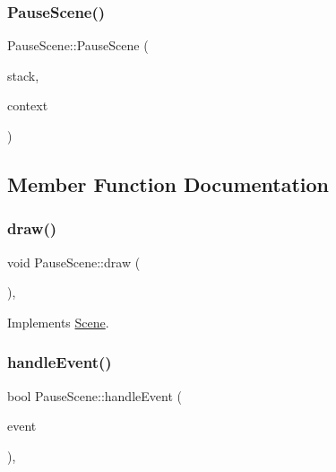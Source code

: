 \subsubsection{\texorpdfstring{Pause\+Scene()}{PauseScene()}}
{\footnotesize\ttfamily Pause\+Scene\+::\+Pause\+Scene (\begin{DoxyParamCaption}\item[{\hyperlink{class_scene_stack}{Scene\+Stack} \&}]{stack,  }\item[{\hyperlink{struct_scene_1_1_context}{Context}}]{context }\end{DoxyParamCaption})}



\subsection{Member Function Documentation}
\hypertarget{class_pause_scene_abfd1398a064a83b3ae6ac5fd98aebf05}{}\label{class_pause_scene_abfd1398a064a83b3ae6ac5fd98aebf05} 
\subsubsection{\texorpdfstring{draw()}{draw()}}
{\footnotesize\ttfamily void Pause\+Scene\+::draw (\begin{DoxyParamCaption}{ }\end{DoxyParamCaption})\hspace{0.3cm}{\ttfamily [override]}, {\ttfamily [virtual]}}



Implements \hyperlink{class_scene_a789c16961aa1e316b2a4a05b95187546}{Scene}.

\hypertarget{class_pause_scene_adeb06e37e0a2afa297ddbe795c3cbe94}{}\label{class_pause_scene_adeb06e37e0a2afa297ddbe795c3cbe94} 
\subsubsection{\texorpdfstring{handle\+Event()}{handleEvent()}}
{\footnotesize\ttfamily bool Pause\+Scene\+::handle\+Event (\begin{DoxyParamCaption}\item[{const sf\+::\+Event \&}]{event }\end{DoxyParamCaption})\hspace{0.3cm}{\ttfamily [override]}, {\ttfamily [virtual]}}



